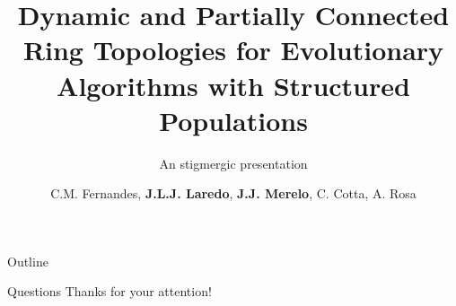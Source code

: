 \documentclass{beamer}[10]
\title{Dynamic and Partially Connected Ring Topologies for Evolutionary Algorithms with Structured Populations}
\subtitle{An stigmergic presentation}
\author{C.M. Fernandes, \textbf{J.L.J. Laredo}, \textbf{J.J. Merelo}, C. Cotta, A. Rosa}
\date{}
\begin{document}
\begin{frame}
  \titlepage
\end{frame}


\begin{frame}{Outline}
  \tableofcontents
\end{frame}






\begin{frame}{Questions}
Thanks for your attention! 
\end{frame}
\end{document}
